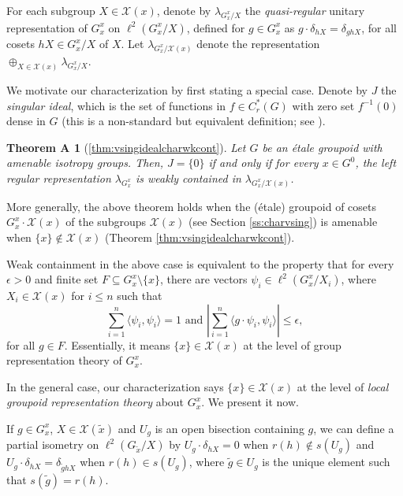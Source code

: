 \documentclass[a4paper, 12pt]{amsart}
\newtheorem*{thmA}{Theorem A}
\theoremstyle{definition}
\theoremstyle{remark}
\numberwithin{equation}{section}
\begin{document}
For each subgroup $X\in \mathcal{X}(x)$, denote by $\lambda_{G^{x}_{x}/X}$ the \emph{quasi-regular} unitary representation of $G^{x}_{x}$ on $\ell^{2}(G^{x}_{x}/X)$, defined for $g\in G^{x}_{x}$ as $g\cdot \delta_{hX} = \delta_{ghX}$, for all cosets $hX\in G^{x}_{x}/X$ of $X$. Let $\lambda_{G^{x}_{x}/\mathcal{X}(x)}$ denote the representation $\oplus_{X\in\mathcal{X}(x)}\lambda_{G^{x}_{x}/X}.$ 

We motivate our characterization by first stating a special case. Denote by $J$ the \emph{singular ideal}, which is the set of functions in $f\in C^{*}_{r}(G)$ with zero set $f^{-1}(0)$ dense in $G$ (this is a non-standard but equivalent definition; see \cite[Lemma~4.1]{BGHL25}).

\begin{thmA}[\ref{thm:vsingidealcharwkcont}]
\label{thmA}
    Let $G$ be an \'etale groupoid with amenable isotropy groups. Then, $J = \{0\}$ if and only if for every $x\in G^{0}$, the left regular representation $\lambda_{G_{x}^{x}}$ is weakly contained in $\lambda_{G^{x}_{x}/\mathcal{X}(x)}$. 
\end{thmA}
More generally, the above theorem holds when the (\'etale) groupoid of cosets $G^{x}_{x}\cdot\mathcal{X}(x)$ of the subgroups $\mathcal{X}(x)$ (see Section \ref{ss:charvsing}) is amenable when $\{x\}\notin \mathcal{X}(x)$ (Theorem \ref{thm:vsingidealcharwkcont}).

Weak containment in the above case is equivalent to the property that for every $\epsilon > 0$ and finite set $F\subseteq G^{x}_{x}\setminus \{x\}$, there are vectors $\psi_{i}\in \ell^{2}(G^{x}_{x}/X_{i})$, where $X_{i}\in\mathcal{X}(x)$ for $i\leq n$ such that $$\sum^{n}_{i=1}\langle \psi_{i}, \psi_{i}\rangle =1\text{ and }|\sum^{n}_{i=1}\langle g\cdot\psi_{i}, \psi_{i}\rangle|\leq \epsilon,$$ for all $g\in F$. Essentially, it means $\{x\}\in\mathcal{X}(x)$ at the level of group representation theory of $G^{x}_{x}$.


In the general case, our characterization says $\{x\}\in\mathcal{X}(x)$ at the level of \emph{local groupoid representation theory} about $G^{x}_{x}$. We present it now.

If $g\in G^{x}_{x}$, $X\in\mathcal{X}(\tilde{x})$ and $U_{g}$ is an open bisection containing $g$, we can define a partial isometry on $\ell^{2}(G_{\tilde{x}}/X)$ by $U_{g}\cdot \delta_{hX} = 0$  when $r(h)\notin s(U_{g})$ and $U_{g}\cdot \delta_{hX} = \delta_{\tilde{g}hX}$ when $r(h)\in s(U_{g})$, where $\tilde{g}\in U_{g}$ is the unique element such that $s(\tilde{g}) = r(h)$.
\end{document}
